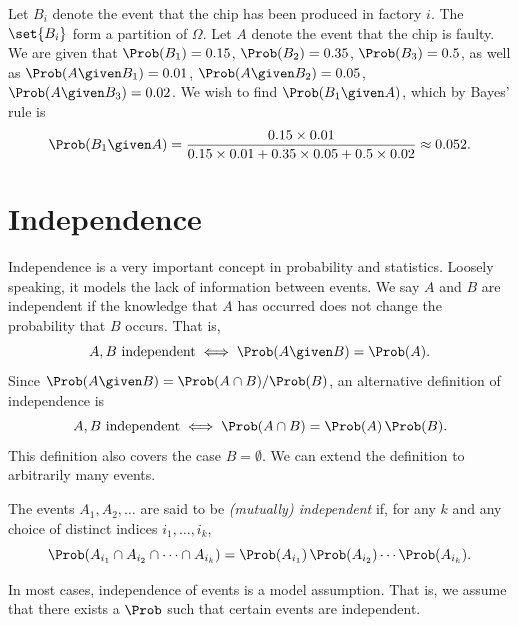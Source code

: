 \begin{solution}
Let $B_i$ denote the event that the chip has been produced in factory $i$. The $\set{B_i}$ form a partition of $\Omega$. Let $A$ denote the event that the chip is faulty. We are given that $\Prob(B_1) = 0.15$, $\Prob(B_2) = 0.35$, $\Prob(B_3) = 0.5$, as well as $\Prob(A \given B_1) = 0.01$, $\Prob(A \given B_2) = 0.05$, $\Prob(A \given B_3) = 0.02$. We wish to find $\Prob(B_1 \given A)$, which by Bayes' rule is
\[
  \Prob(B_1 \given A) = \frac{0.15 \times 0.01}{0.15 \times 0.01 + 0.35 \times 0.05 + 0.5 \times 0.02} \approx 0.052.
\]
\end{solution}

\section{Independence}\label{sec:independence}

Independence is a very important concept in probability and statistics. Loosely speaking, it models the lack of information between events. We say $A$ and $B$ are independent if the knowledge that $A$ has occurred does not change the probability that $B$ occurs. That is,
\[
  A, B \text{ independent} \iff \Prob(A \given B) = \Prob(A).
\]
Since $\Prob(A \given B) = \Prob(A \cap B)/\Prob(B)$, an alternative definition of independence is
\[
  A, B \text{ independent} \iff \Prob(A \cap B) = \Prob(A)\,\Prob(B).
\]
This definition also covers the case $B = \emptyset$. We can extend the definition to arbitrarily many events.

\begin{definition}\label{def:independent-events}
The events $A_1, A_2, \ldots$ are said to be \emph{(mutually) independent} if, for any $k$ and any choice of distinct indices $i_1, \ldots, i_k$,
\[
  \Prob(A_{i_1} \cap A_{i_2} \cap \cdots \cap A_{i_k}) = \Prob(A_{i_1})\,\Prob(A_{i_2}) \cdots \Prob(A_{i_k}).
\]
\end{definition}

\begin{remark}\label{rem:independence-model-assumption}
In most cases, independence of events is a model assumption. That is, we assume that there exists a $\Prob$ such that certain events are independent.
\end{remark}

